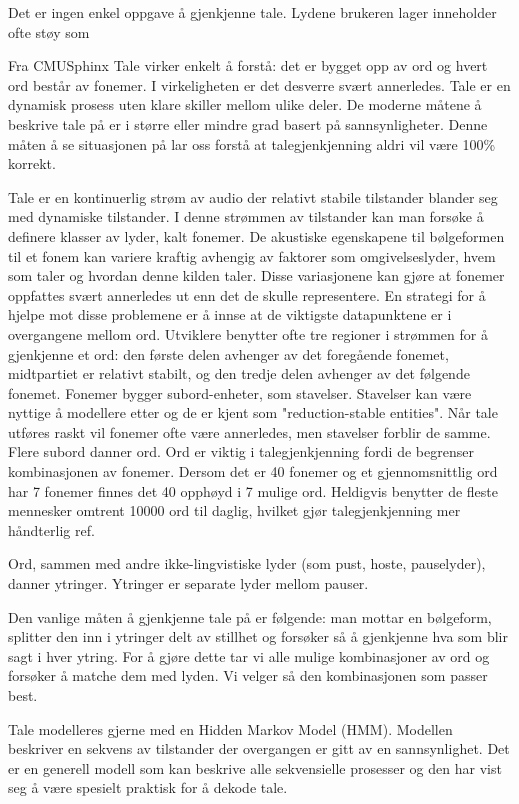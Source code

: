 Det er ingen enkel oppgave å gjenkjenne tale. Lydene brukeren lager inneholder ofte støy som 

{\color{blue}Fra CMUSphinx}
Tale virker enkelt å forstå: det er bygget opp av ord og hvert ord består av fonemer. I virkeligheten er det desverre svært annerledes. Tale er en dynamisk prosess uten klare skiller mellom ulike deler. De moderne måtene å beskrive tale på er i større eller mindre grad basert på sannsynligheter. Denne måten å se situasjonen på lar oss forstå at talegjenkjenning aldri vil være 100\% korrekt.

Tale er en kontinuerlig strøm av audio der relativt stabile tilstander blander seg med dynamiske tilstander. I denne strømmen av tilstander kan man forsøke å definere klasser av lyder, kalt fonemer. De akustiske egenskapene til bølgeformen til et fonem kan variere kraftig avhengig av faktorer som omgivelseslyder, hvem som taler og hvordan denne kilden taler. Disse variasjonene kan gjøre at fonemer oppfattes svært annerledes ut enn det de skulle representere. 
En strategi for å hjelpe mot disse problemene er å innse at de viktigste datapunktene er i overgangene mellom ord. Utviklere benytter ofte tre regioner i strømmen for å gjenkjenne et ord: den første delen avhenger av det foregående fonemet, midtpartiet er relativt stabilt, og den tredje delen avhenger av det følgende fonemet. Fonemer bygger subord-enheter, som stavelser. Stavelser kan være nyttige å modellere etter og de er kjent som "reduction-stable entities". Når tale utføres raskt vil fonemer ofte være annerledes, men stavelser forblir de samme. Flere subord danner ord. Ord er viktig i talegjenkjenning fordi de begrenser kombinasjonen av fonemer. Dersom det er 40 fonemer og et gjennomsnittlig ord har 7 fonemer finnes det 40 opphøyd i 7 mulige ord. Heldigvis benytter de fleste mennesker omtrent 10000 ord til daglig, hvilket gjør talegjenkjenning mer håndterlig {\color{red}ref}.

Ord, sammen med andre ikke-lingvistiske lyder (som pust, hoste, pauselyder), danner ytringer. Ytringer er separate lyder mellom pauser. 

Den vanlige måten å gjenkjenne tale på er følgende: man mottar en bølgeform, splitter den inn i ytringer delt av stillhet og forsøker så å gjenkjenne hva som blir sagt i hver ytring. For å gjøre dette tar vi alle mulige kombinasjoner av ord og forsøker å matche dem med lyden. Vi velger så den kombinasjonen som passer best.

Tale modelleres gjerne med en Hidden Markov Model (HMM). Modellen beskriver en sekvens av tilstander der overgangen er gitt av en sannsynlighet. Det er en generell modell som kan beskrive alle sekvensielle prosesser og den har vist seg å være spesielt praktisk for å dekode tale.

